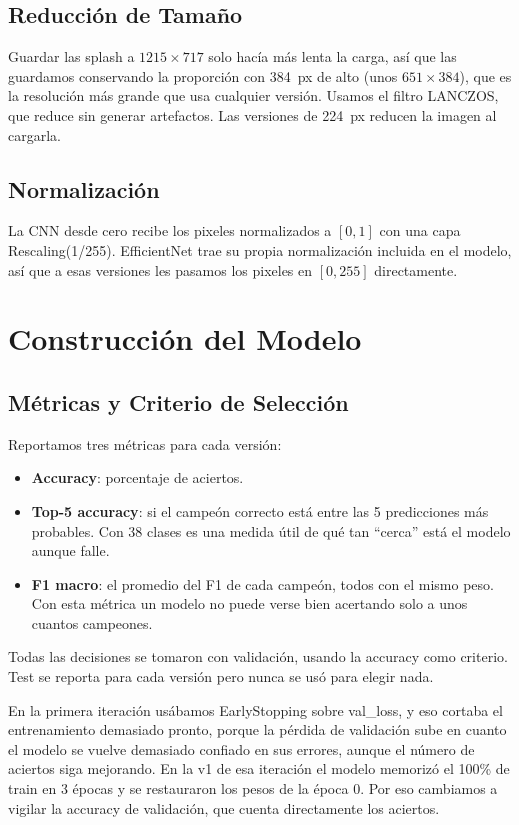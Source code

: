 \documentclass[10pt,twocolumn]{article}
\begin{document}
\subsection{Reducción de Tamaño}

Guardar las splash a $1215\times717$ solo hacía más lenta la carga, así que las guardamos conservando la proporción con 384~px de alto (unos $651\times384$), que es la resolución más grande que usa cualquier versión. Usamos el filtro LANCZOS, que reduce sin generar artefactos. Las versiones de 224~px reducen la imagen al cargarla.

\subsection{Normalización}

La CNN desde cero recibe los pixeles normalizados a $[0,1]$ con una capa Rescaling(1/255). EfficientNet trae su propia normalización incluida en el modelo, así que a esas versiones les pasamos los pixeles en $[0,255]$ directamente.

\section{Construcción del Modelo}

\subsection{Métricas y Criterio de Selección}

Reportamos tres métricas para cada versión:

\begin{itemize}
  \item \textbf{Accuracy}: porcentaje de aciertos.
  \item \textbf{Top-5 accuracy}: si el campeón correcto está entre las 5 predicciones más probables. Con 38 clases es una medida útil de qué tan ``cerca'' está el modelo aunque falle.
  \item \textbf{F1 macro}: el promedio del F1 de cada campeón, todos con el mismo peso. Con esta métrica un modelo no puede verse bien acertando solo a unos cuantos campeones.
\end{itemize}

Todas las decisiones se tomaron con validación, usando la accuracy como criterio. Test se reporta para cada versión pero nunca se usó para elegir nada.

En la primera iteración usábamos EarlyStopping sobre val\_loss, y eso cortaba el entrenamiento demasiado pronto, porque la pérdida de validación sube en cuanto el modelo se vuelve demasiado confiado en sus errores, aunque el número de aciertos siga mejorando. En la v1 de esa iteración el modelo memorizó el 100\% de train en 3 épocas y se restauraron los pesos de la época 0. Por eso cambiamos a vigilar la accuracy de validación, que cuenta directamente los aciertos.
\end{document}
